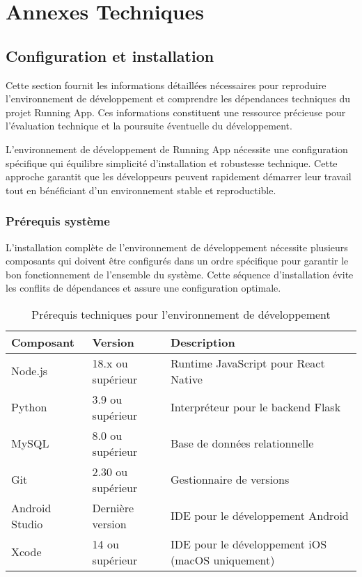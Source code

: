 \section{Annexes Techniques}

\subsection{Configuration et installation}

Cette section fournit les informations détaillées nécessaires pour reproduire l'environnement de développement et comprendre les dépendances techniques du projet Running App. Ces informations constituent une ressource précieuse pour l'évaluation technique et la poursuite éventuelle du développement.

L'environnement de développement de Running App nécessite une configuration spécifique qui équilibre simplicité d'installation et robustesse technique. Cette approche garantit que les développeurs peuvent rapidement démarrer leur travail tout en bénéficiant d'un environnement stable et reproductible.

\subsubsection{Prérequis système}

L'installation complète de l'environnement de développement nécessite plusieurs composants qui doivent être configurés dans un ordre spécifique pour garantir le bon fonctionnement de l'ensemble du système. Cette séquence d'installation évite les conflits de dépendances et assure une configuration optimale.

\begin{table}[h]
\centering
\begin{tabular}{|l|l|p{6cm}|}
\hline
\textbf{Composant} & \textbf{Version} & \textbf{Description} \\
\hline
Node.js & 18.x ou supérieur & Runtime JavaScript pour React Native \\
\hline
Python & 3.9 ou supérieur & Interpréteur pour le backend Flask \\
\hline
MySQL & 8.0 ou supérieur & Base de données relationnelle \\
\hline
Git & 2.30 ou supérieur & Gestionnaire de versions \\
\hline
Android Studio & Dernière version & IDE pour le développement Android \\
\hline
Xcode & 14 ou supérieur & IDE pour le développement iOS (macOS uniquement) \\
\hline
\end{tabular}
\caption{Prérequis techniques pour l'environnement de développement}
\end{table}


